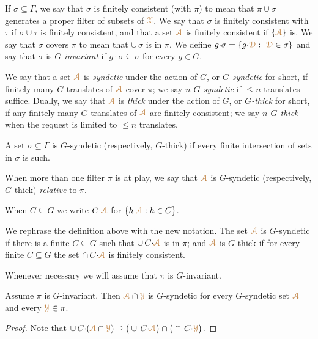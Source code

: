 If $\sigma\subseteq\Gamma$, we say that $\sigma$ is finitely consistent (with $\pi$) to mean that $\pi\cup\sigma$ generates a proper filter of subsets of ${\color{brown}\EuScript X}$.
We say that $\sigma$ is finitely consistent with $\tau$ if $\sigma\cup\tau$ is finitely consistent, and that a set ${\color{brown}\EuScript A}$ is finitely consistent if $\{{\color{brown}\EuScript A}\}$ is.
We say that $\sigma$ covers $\pi$ to mean that $\cup\,\sigma$ is in $\pi$.
We define $g{\cdot}\sigma=\{g{\cdot}\mrD:\ \mrD\in\sigma\}$ and say that $\sigma$ is \emph{$G$-invariant\/} if $g{\cdot}\sigma\subseteq \sigma$ for every $g\in G$.

We say that a set ${\color{brown}\EuScript A}$ is \emph{syndetic\/} under the action of $G$, or \emph{$G$-syndetic\/} for short, if finitely many $G$-translates of ${\color{brown}\EuScript A}$ cover $\pi$; we say \emph{$n$-$G$-syndetic\/} if $\le n$ translates suffice.
Dually, we say that ${\color{brown}\EuScript A}$ is \emph{thick\/} under the action of $G$, or \emph{$G$-thick\/} for short, if any finitely many $G$-translates of ${\color{brown}\EuScript A}$ are finitely consistent; we say \emph{$n$-$G$-thick\/} when the request is limited to $\le n$ translates.

A set $\sigma\subseteq\Gamma$ is $G$-syndetic (respectively, $G$-thick) if every finite intersection of sets in $\sigma$ is such.

When more than one filter $\pi$ is at play, we say that ${\color{brown}\EuScript A}$ is $G$-syndetic (respectively, $G$-thick) \emph{relative\/} to $\pi$.

\begin{notation}
  When $C\subseteq G$ we write \emph{$C{\cdot}{\color{brown}\EuScript A}$\/} for $\{h{\cdot}{\color{brown}\EuScript A} : h\in C\}$.
\end{notation}

We rephrase the definition above with the new notation.
The set ${\color{brown}\EuScript A}$ is $G$-syndetic if there is a finite $C\subseteq G$ such that $\cup\,C{\cdot}{\color{brown}\EuScript A}$ is in $\pi$; and ${\color{brown}\EuScript A}$ is $G$-thick if for every finite $C\subseteq G$ the set $\cap\,C{\cdot}{\color{brown}\EuScript A}$ is finitely consistent.

Whenever necessary we will assume that $\pi$ is $G$-invariant.

\begin{fact}\label{fact_pi_invariant}
  Assume $\pi$ is $G$-invariant.
  Then ${\color{brown}\EuScript A}\cap{\color{brown}\EuScript Y}$ is $G$-syndetic for every $G$-syndetic set ${\color{brown}\EuScript A}$ and every ${\color{brown}\EuScript Y}\in\pi$.
\end{fact}

\begin{proof}
  Note that $\cup\,C{\cdot}({\color{brown}\EuScript A}\cap{\color{brown}\EuScript Y})\supseteq\big(\cup\,C{\cdot}{\color{brown}\EuScript A}\big)\cap\big(\cap\,C{\cdot}{\color{brown}\EuScript Y}\big)$.
\end{proof}

